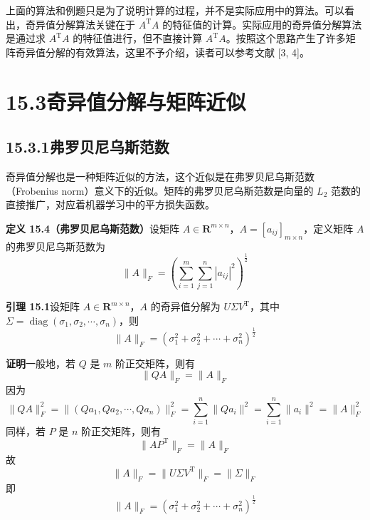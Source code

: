 \documentclass[UTF8, 12pt, fontset=fandol, oneside]{ctexart}
\begin{document}
上面的算法和例题只是为了说明计算的过程，并不是实际应用中的算法。可以看出，奇异值分解算法关键在于 $A^{\mathrm{T}}A$ 的特征值的计算。实际应用的奇异值分解算法是通过求 $A^{\mathrm{T}}A$ 的特征值进行，但不直接计算 $A^{\mathrm{T}}A$。按照这个思路产生了许多矩阵奇异值分解的有效算法，这里不予介绍，读者可以参考文献 [3, 4]。

\section*{15.3\quad 奇异值分解与矩阵近似}

\subsection*{15.3.1\quad 弗罗贝尼乌斯范数}

奇异值分解也是一种矩阵近似的方法，这个近似是在弗罗贝尼乌斯范数（Frobenius norm）意义下的近似。矩阵的弗罗贝尼乌斯范数是向量的 $L_2$ 范数的直接推广，对应着机器学习中的平方损失函数。

\noindent\textbf{定义 15.4（弗罗贝尼乌斯范数）}\quad 设矩阵 $A\in\mathbf{R}^{m\times n}$，$A=[a_{ij}]_{m\times n}$，定义矩阵 $A$ 的弗罗贝尼乌斯范数为
\begin{equation}
\|A\|_F=\left(\sum_{i=1}^m\sum_{j=1}^n |a_{ij}|^2\right)^{\frac12}
\tag{15.25}
\end{equation}

\noindent\textbf{引理 15.1}\quad 设矩阵 $A\in\mathbf{R}^{m\times n}$，$A$ 的奇异值分解为 $U\Sigma V^{\mathrm{T}}$，其中 $\Sigma=\operatorname{diag}(\sigma_1,\sigma_2,\cdots,\sigma_n)$，则
\begin{equation}
\|A\|_F=(\sigma_1^2+\sigma_2^2+\cdots+\sigma_n^2)^{\frac12}
\tag{15.26}
\end{equation}

\noindent\textbf{证明}\quad 一般地，若 $Q$ 是 $m$ 阶正交矩阵，则有
\begin{equation}
\|QA\|_F=\|A\|_F
\tag{15.27}
\end{equation}
因为
\[
\|QA\|_F^2=\|(Qa_1,Qa_2,\cdots,Qa_n)\|_F^2
=\sum_{i=1}^n\|Qa_i\|^2
=\sum_{i=1}^n\|a_i\|^2
=\|A\|_F^2
\]
同样，若 $P$ 是 $n$ 阶正交矩阵，则有
\begin{equation}
\|AP^{\mathrm{T}}\|_F=\|A\|_F
\tag{15.28}
\end{equation}
故
\begin{equation}
\|A\|_F=\|U\Sigma V^{\mathrm{T}}\|_F=\|\Sigma\|_F
\tag{15.29}
\end{equation}
即
\begin{equation}
\|A\|_F=(\sigma_1^2+\sigma_2^2+\cdots+\sigma_n^2)^{\frac12}
\tag{15.30}
\end{equation}
\end{document}
